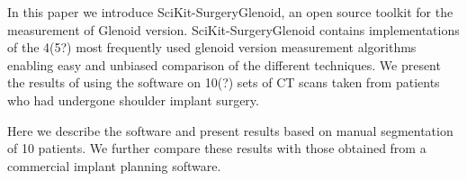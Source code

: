 
In this paper we introduce SciKit-SurgeryGlenoid, an open source toolkit for the measurement
of Glenoid version. SciKit-SurgeryGlenoid contains implementations of the 4(5?) most 
frequently used glenoid version measurement algorithms enabling easy and unbiased comparison of 
the different techniques. We present the results of using the software on 10(?) sets of
CT scans taken from patients who had undergone shoulder implant surgery.    

Here we describe the software and present results based on manual segmentation of 10 
patients. We further compare these results with those obtained from a commercial 
implant planning software. 

